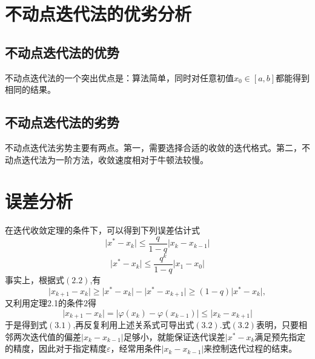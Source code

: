 \section{不动点迭代法的优劣分析}
\subsection{不动点迭代法的优势}
不动点迭代法的一个突出优点是：算法简单，同时对任意初值$x_0 \in [a,b]$都能得到相同的结果。
\subsection{不动点迭代法的劣势}
不动点迭代法劣势主要有两点。第一，需要选择合适的收敛的迭代格式。第二，不动点迭代法为一阶方法，收敛速度相对于牛顿法较慢。
\section{误差分析}
在迭代收敛定理的条件下，可以得到下列误差估计式
\begin{equation}
\lvert x^*-x_k\rvert\leq \frac q {1-q} \lvert x_k-x_{k-1}\rvert
\end{equation}
\begin{equation}
\lvert x^*-x_k\rvert\leq \frac {q^k} {1-q} \lvert x_1-x_0\rvert
\end{equation}
事实上，根据式$(2.2)$,有
\begin{equation}
\lvert x_{k+1}-x_k\rvert\geq\lvert x^*-x_k \rvert-\lvert x^*-x_{k+1}\rvert\geq(1-q)\lvert x^*-x_k\rvert,
\end{equation}
又利用定理2.1的条件$2$得
\begin{equation}
\lvert x_{k+1}-x_k\rvert=\lvert \varphi(x_k)-\varphi (x_{k-1})\rvert\leq\lvert x_k-x_{k+1} \rvert
\end{equation}
于是得到式$(3.1)$,再反复利用上述关系式可导出式$(3.2)$.式$(3.2)$表明，只要相邻两次迭代值的偏差$\lvert x_k - x_{k-1} \rvert$足够小，就能保证迭代误差$\vert x^*-x_k$满足预先指定的精度，因此对于指定精度$\varepsilon$，经常用条件$\lvert x_k -x_{k-1}\rvert$来控制迭代过程的结束。
